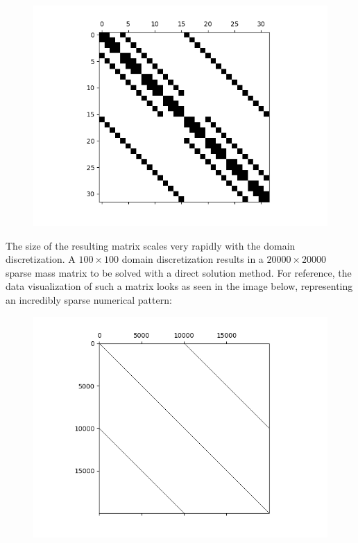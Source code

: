 \documentclass[12pt,a4paper,pagesize=pdftex]{scrartcl}
\begin{document}
\begin{figure}[H]
    \centering
    \includegraphics[scale=1.0]{img/spy4.png}
\end{figure}

The size of the resulting matrix scales very rapidly with the domain discretization. A \(100 \times 100\) domain discretization results in a \(20000 \times 20000\) sparse mass matrix to be solved with a direct solution method. For reference, the data visualization of such a matrix looks as seen in the image below, representing an incredibly sparse numerical pattern:

\begin{figure}[H]
    \centering
    \includegraphics[scale=1.0]{img/spy100.png}
\end{figure}
\end{document}
